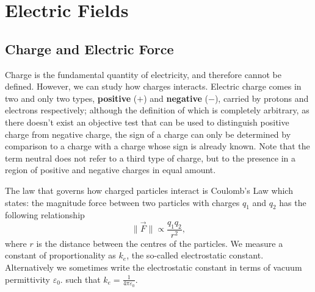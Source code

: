 \section{Electric Fields}

\subsection{Charge and Electric Force}

Charge is the fundamental quantity of electricity, and therefore cannot be defined. However, we can study how charges interacts. Electric charge comes in two and only two types, \textbf{positive} ($+$) and \textbf{negative} ($-$), carried by protons and electrons respectively; although the definition of which is completely arbitrary, as there doesn't exist an objective test that can be used to distinguish positive charge from negative charge, the sign of a charge can only be determined by comparison to a charge with a charge whose sign is already known. Note that the term neutral does not refer to a third type of charge, but to the presence in a region of positive and negative charges in equal amount. 

The law that governs how charged particles interact is Coulomb's Law which states: the magnitude force between two particles with charges $q_1$ and $q_2$ has the following relationship
\begin{equation}
    \| \vec{F} \| \propto \frac{q_1 q_2}{r^2},
\end{equation}
where $r$ is the distance between the centres of the particles. We measure a constant of proportionality as $k_e$, the so-called electrostatic constant. Alternatively we sometimes write the electrostatic constant in terms of vacuum permittivity $\varepsilon_0$. such that $k_e = \frac{1}{4\pi \varepsilon_0}$. 

